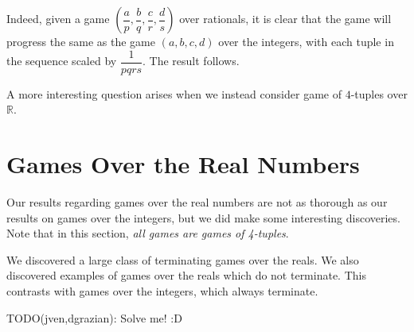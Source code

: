 \documentclass[12pt]{amsart}
\begin{document}
Indeed, given a game $\left(\dfrac{a}{p}, \dfrac{b}{q}, \dfrac{c}{r}, \dfrac{d}{s}\right)$ over rationals, it is clear that the game will progress the same as the game $(a, b, c, d)$ over the integers, with each tuple in the sequence scaled by $\dfrac{1}{pqrs}$. The result follows.

A more interesting question arises when we instead consider game of $4$-tuples over $\mathbb{R}$.

\section{Games Over the Real Numbers}

Our results regarding games over the real numbers are not as thorough as our results on games over the integers, but we did make some interesting discoveries. Note that in this section, \emph{all games are games of 4-tuples}.

We discovered a large class of terminating games over the reals. We also discovered examples of games over the reals which do not terminate. This contrasts with games over the integers, which always terminate.



TODO(jven,dgrazian): Solve me! :D
\end{document}

